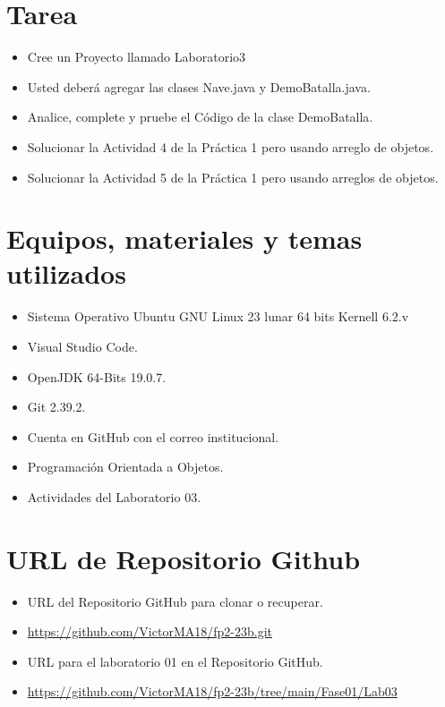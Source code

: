 \documentclass{article}
\begin{document}
	\section{Tarea}
	\begin{itemize}		
        \item Cree un Proyecto llamado Laboratorio3
        \item Usted deberá agregar las clases Nave.java y DemoBatalla.java.
        \item Analice, complete y pruebe el Código de la clase DemoBatalla.
        \item Solucionar la Actividad 4 de la Práctica 1 pero usando arreglo de objetos.
        \item Solucionar la Actividad 5 de la Práctica 1 pero usando arreglos de objetos.
	\end{itemize}
		
	\section{Equipos, materiales y temas utilizados}
	\begin{itemize}
		\item Sistema Operativo Ubuntu GNU Linux 23 lunar 64 bits Kernell 6.2.v
		\item Visual Studio Code.
		\item OpenJDK 64-Bits 19.0.7.
		\item Git 2.39.2.
		\item Cuenta en GitHub con el correo institucional.
		\item Programación Orientada a Objetos.
		\item Actividades del Laboratorio 03.	
	\end{itemize}
	
	\section{URL de Repositorio Github}
	\begin{itemize}
		\item URL del Repositorio GitHub para clonar o recuperar.
		\item \url{https://github.com/VictorMA18/fp2-23b.git}
		\item URL para el laboratorio 01 en el Repositorio GitHub.
		\item \url{https://github.com/VictorMA18/fp2-23b/tree/main/Fase01/Lab03}
	\end{itemize}
	
\end{document}
